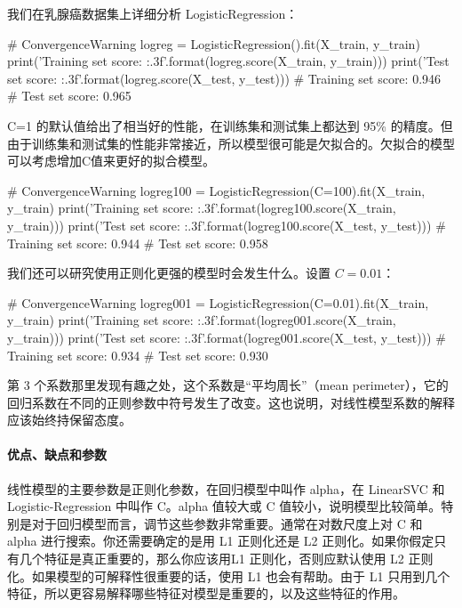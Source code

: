 我们在乳腺癌数据集上详细分析 LogisticRegression：
\begin{pyc}
    # ConvergenceWarning
    logreg = LogisticRegression().fit(X_train, y_train)
    print('Training set score: {:.3f}'.format(logreg.score(X_train, y_train)))
    print('Test set score: {:.3f}'.format(logreg.score(X_test, y_test)))
    # Training set score: 0.946
    # Test set score: 0.965
\end{pyc}

C=1 的默认值给出了相当好的性能，在训练集和测试集上都达到 95\% 的精度。但由于训练集和测试集的性能非常接近，所以模型很可能是欠拟合的。欠拟合的模型可以考虑增加C值来更好的拟合模型。

\begin{pyc}
    # ConvergenceWarning
    logreg100 = LogisticRegression(C=100).fit(X_train, y_train)
    print('Training set score: {:.3f}'.format(logreg100.score(X_train, y_train)))
    print('Test set score: {:.3f}'.format(logreg100.score(X_test, y_test)))
    # Training set score: 0.944
    # Test set score: 0.958
\end{pyc}

我们还可以研究使用正则化更强的模型时会发生什么。设置 $C=0.01$：

\begin{pyc}
    # ConvergenceWarning
    logreg001 = LogisticRegression(C=0.01).fit(X_train, y_train)
    print('Training set score: {:.3f}'.format(logreg001.score(X_train, y_train)))
    print('Test set score: {:.3f}'.format(logreg001.score(X_test, y_test)))
    # Training set score: 0.934
    # Test set score: 0.930
\end{pyc}


\begin{tcolorbox}
    第 3 个系数那里发现有趣之处，这个系数是“平均周长”（mean perimeter），它的回归系数在不同的正则参数中符号发生了改变。这也说明，对线性模型系数的解释应该始终持保留态度。
\end{tcolorbox}
\paragraph{优点、缺点和参数}
线性模型的主要参数是正则化参数，在回归模型中叫作 alpha，在 LinearSVC 和 Logistic-Regression 中叫作 C。alpha 值较大或 C 值较小，说明模型比较简单。特别是对于回归模型而言，调节这些参数非常重要。通常在对数尺度上对 C 和 alpha 进行搜索。你还需要确定的是用 L1 正则化还是 L2 正则化。如果你假定只有几个特征是真正重要的，那么你应该用L1 正则化，否则应默认使用 L2 正则化。如果模型的可解释性很重要的话，使用 L1 也会有帮助。由于 L1 只用到几个特征，所以更容易解释哪些特征对模型是重要的，以及这些特征的作用。

